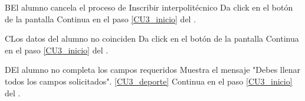	\begin{UCtrayectoriaA}{B}{El alumno cancela el proceso de Inscribir interpolitécnico}
		\UCpaso[\UCactor] Da click en el botón  de la pantalla 
		\UCpaso  Continua en el paso \ref{CU3_inicio} del .
	\end{UCtrayectoriaA}

	\begin{UCtrayectoriaA}{C}{Los datos del alumno no coinciden}
		\UCpaso[\UCactor] Da click en el botón  de la pantalla 
		\UCpaso Continua en el paso \ref{CU3_inicio} del .
	\end{UCtrayectoriaA}
	
	\begin{UCtrayectoriaA}{D}{El alumno no completa los campos requeridos}
		\UCpaso Muestra el mensaje "Debes llenar todos los campos solicitados". \ref{CU3_deporte}
		\UCpaso Continua en el paso \ref{CU3_inicio} del .
	\end{UCtrayectoriaA}